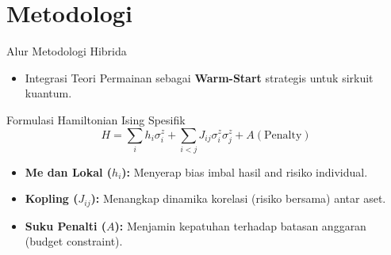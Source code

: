 \documentclass[aspectratio=169]{beamer}
\begin{document}
\section{Metodologi}

\begin{frame}{Alur Metodologi Hibrida}
    \begin{center}
    \end{center}
    \begin{itemize}
        \item Integrasi Teori Permainan sebagai \textbf{Warm-Start} strategis untuk sirkuit kuantum.
    \end{itemize}
\end{frame}

\begin{frame}{Formulasi Hamiltonian Ising Spesifik}
    \begin{equation}
        H = \sum_i h_i \sigma_i^z + \sum_{i<j} J_{ij} \sigma_i^z \sigma_j^z + A(\text{Penalty})
    \end{equation}
    \begin{itemize}
        \item \textbf{Me dan  Lokal ($h_i$):} Menyerap bias imbal hasil and risiko individual.
        \item \textbf{Kopling ($J_{ij}$):} Menangkap dinamika korelasi (risiko bersama) antar aset.
        \item \textbf{Suku Penalti ($A$):} Menjamin kepatuhan terhadap batasan anggaran (budget constraint).
    \end{itemize}
\end{frame}
\end{document}
